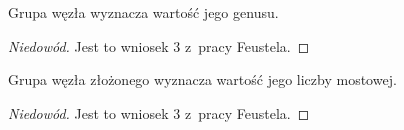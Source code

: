 \begin{proposition}
    Grupa węzła wyznacza wartość jego genusu.
\end{proposition}
\begin{proof}[Niedowód]
    Jest to wniosek 3 z~pracy \cite{feustel78} Feustela.
\end{proof}
\begin{proposition}
    Grupa węzła złożonego wyznacza wartość jego liczby mostowej.
\end{proposition}
\begin{proof}[Niedowód]
    Jest to wniosek 3 z~pracy \cite{feustel78} Feustela.
\end{proof}






